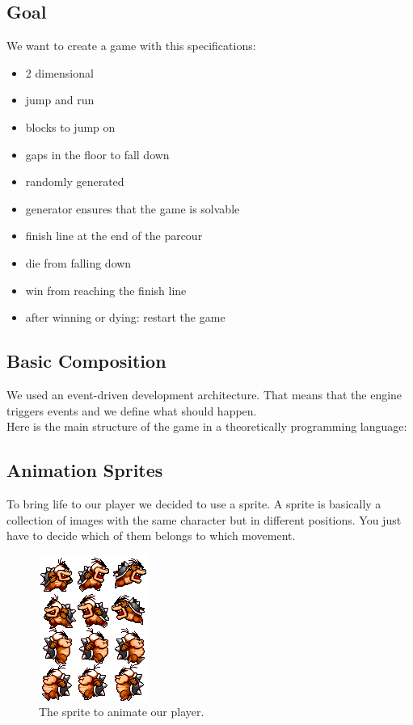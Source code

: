 \subsection{Goal}
  We want to create a game with this specifications:
  \begin{itemize}
    \item 2 dimensional
    \item jump and run
    \item blocks to jump on
    \item gaps in the floor to fall down
    \item randomly generated
    \item generator ensures that the game is solvable
    \item finish line at the end of the parcour
    \item die from falling down
    \item win from reaching the finish line
    \item after winning or dying: restart the game
  \end{itemize}

\subsection{Basic Composition}
We used an event-driven development architecture. That means that the engine triggers events and we define what should happen.\bigskip\\
Here is the main structure of the game in a theoretically programming language:


\subsection{Animation Sprites}
To bring life to our player we decided to use a sprite. A sprite is basically a collection of images with the same character but in different positions. You just have to decide which of them belongs to which movement.\bigskip\\

\begin{figure}[H]
  \includegraphics{images/player.png}
  \caption{The sprite to animate our player.}
\end{figure}

